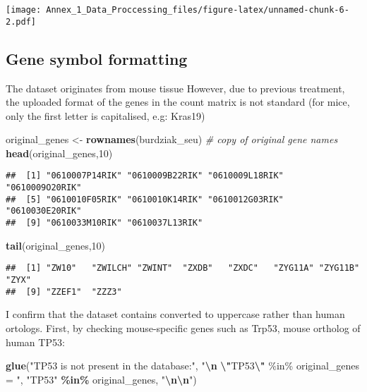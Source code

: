 \documentclass[
]{article}
\newenvironment{Shaded}{\begin{snugshade}}{\end{snugshade}}
\newcommand{\CommentTok}[1]{\textcolor[rgb]{0.56,0.35,0.01}{\textit{#1}}}
\newcommand{\DecValTok}[1]{\textcolor[rgb]{0.00,0.00,0.81}{#1}}
\newcommand{\FunctionTok}[1]{\textcolor[rgb]{0.13,0.29,0.53}{\textbf{#1}}}
\newcommand{\NormalTok}[1]{#1}
\newcommand{\OtherTok}[1]{\textcolor[rgb]{0.56,0.35,0.01}{#1}}
\newcommand{\SpecialCharTok}[1]{\textcolor[rgb]{0.81,0.36,0.00}{\textbf{#1}}}
\newcommand{\StringTok}[1]{\textcolor[rgb]{0.31,0.60,0.02}{#1}}
\begin{document}
\texttt{[image: Annex\_1\_Data\_Proccessing\_files/figure-latex/unnamed-chunk-6-2.pdf]}

\subsection{Gene symbol formatting}\label{gene-symbol-formatting}

The dataset originates from mouse tissue However, due to previous
treatment, the uploaded format of the genes in the count matrix is not
standard (for mice, only the first letter is capitalised, e.g: Kras19)

\begin{Shaded}
\begin{Highlighting}[]
\NormalTok{original\_genes }\OtherTok{\textless{}{-}} \FunctionTok{rownames}\NormalTok{(burdziak\_seu) }\CommentTok{\# copy of original gene names }
\FunctionTok{head}\NormalTok{(original\_genes,}\DecValTok{10}\NormalTok{) }
\end{Highlighting}
\end{Shaded}

\begin{verbatim}
##  [1] "0610007P14RIK" "0610009B22RIK" "0610009L18RIK" "0610009O20RIK"
##  [5] "0610010F05RIK" "0610010K14RIK" "0610012G03RIK" "0610030E20RIK"
##  [9] "0610033M10RIK" "0610037L13RIK"
\end{verbatim}

\begin{Shaded}
\begin{Highlighting}[]
\FunctionTok{tail}\NormalTok{(original\_genes,}\DecValTok{10}\NormalTok{)}
\end{Highlighting}
\end{Shaded}

\begin{verbatim}
##  [1] "ZW10"   "ZWILCH" "ZWINT"  "ZXDB"   "ZXDC"   "ZYG11A" "ZYG11B" "ZYX"   
##  [9] "ZZEF1"  "ZZZ3"
\end{verbatim}

I confirm that the dataset contains converted to uppercase rather than
human ortologs. First, by checking mouse-specific genes such as Trp53,
mouse ortholog of human TP53:

\begin{Shaded}
\begin{Highlighting}[]
\FunctionTok{glue}\NormalTok{(}\StringTok{"TP53 is not present in the database:"}\NormalTok{, }\StringTok{"}\SpecialCharTok{\textbackslash{}n}\StringTok{ }\SpecialCharTok{\textbackslash{}"}\StringTok{TP53}\SpecialCharTok{\textbackslash{}"}\StringTok{ \%in\% original\_genes = "}\NormalTok{,}
     \StringTok{"TP53"} \SpecialCharTok{\%in\%}\NormalTok{ original\_genes, }\StringTok{"}\SpecialCharTok{\textbackslash{}n\textbackslash{}n}\StringTok{"}\NormalTok{)}
\end{Highlighting}
\end{Shaded}
\end{document}
